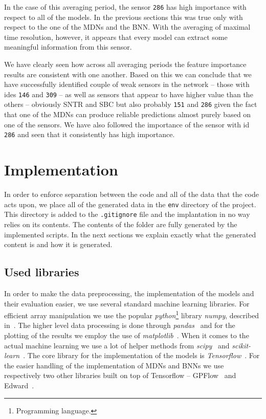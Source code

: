 \documentclass[12pt,a4paper,twoside]{scrartcl}
\numberwithin{equation}{section}
\begin{document}
In the case of this  averaging period, the sensor \texttt{286} has high importance with respect to all of the models. In the previous sections this was true only with respect to the one of the MDNs and the BNN. With the averaging of maximal time resolution, however, it appears that every model can extract some meaningful information from this sensor.

We have clearly seen how across all averaging periods the feature importance results are consistent with one another. Based on this we can conclude that we have successfully identified couple of weak sensors in the network -- those with ides \texttt{146} and \texttt{309} -- as well as sensors that appear to have higher value than the others -- obviously SNTR and SBC but also probably \texttt{151} and \texttt{286} given the fact that one of the MDNs can produce reliable predictions almost purely based on one of the sensors. We have also followed the importance of the sensor with id \texttt{286} and seen that it consistently has high importance. 
\vfill
\clearpage
\section{Implementation}\label{sec:impl}
In order to enforce separation between the code and all of the data that the code acts upon, we place all of the generated data in the \texttt{env} directory of the project. This directory is added to the \texttt{.gitignore} file and the implantation in no way relies on its contents. The contents of the folder are fully generated by the implemented scripts. In the next sections we explain exactly what the generated content is and how it is generated.
\subsection{Used libraries}\label{sec:libs}
In order to make the data preprocessing, the implementation of the models and their evaluation easier, we use several standard machine learning libraries. For efficient array manipulation we use the popular \emph{python}\footnote{Programming language.} library \emph{numpy}, described in~\cite{numpy}. The higher level data processing is done through \emph{pandas}~\cite{pandas} and for the plotting of the results we employ the use of \emph{matplotlib}~\cite{matplotlib}. When it comes to the actual machine learning we use a lot of helper methods from \emph{scipy}~\cite{scipy} and \emph{scikit-learn}~\cite{scikit-learn}. The core library for the implementation of the models is \emph{Tensorflow}~\cite{tf}. For the easier handling of the implementation of MDNs and BNNs we use respectively two other libraries built on top of Tensorflow -- GPFlow~\cite{gpflow} and Edward~\cite{edward}. 
\end{document}
